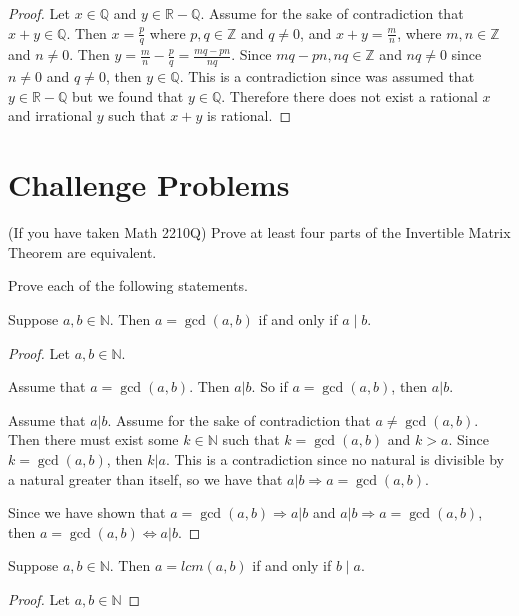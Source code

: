 \documentclass[12 pt]{exam}
\begin{document}
\begin{questions}
\begin{parts}
\begin{solution}\begin{proof}
  Let $x \in \mathbb{Q}$ and $y \in \mathbb{R-Q}$. Assume for the sake of contradiction that $x+y \in \mathbb{Q}$.
  Then $x = \frac{p}{q}$ where $p,q \in \mathbb{Z}$ and $q \ne 0$, and $x+y = \frac{m}{n}$, where $m,n
  \in \mathbb{Z}$ and $n \ne 0$. Then $y = \frac{m}{n} - \frac{p}{q} = \frac{mq - pn}{nq}$. Since $mq-pn, nq \in \mathbb{Z}$ and $nq \ne 0$ since $n \ne 0$ and $q \ne 0$, then $y \in \mathbb{Q}$. This is a contradiction
  since was assumed that $y \in \mathbb{R-Q}$ but we found that $y \in \mathbb{Q}$. Therefore there does not
  exist a rational $x$ and irrational $y$ such that $x+y$ is rational.
\end{proof}\end{solution}
\end{parts}





\section*{Challenge Problems}
\question (If you have taken Math 2210Q) Prove at least four parts of the Invertible Matrix Theorem are equivalent.

Prove each of the following statements.

\question Suppose $a, b \in \mathbb{N}$. Then $a=\gcd(a,b)$ if and only if $a \mid b.$
\begin{solution}\begin{proof}
  Let $a, b \in \mathbb{N}$.

  Assume that $a = \gcd(a,b)$. Then $a | b$. So if $a = \gcd(a,b)$, then $a | b$.

  Assume that $a | b$. Assume for the sake of contradiction that $a \ne \gcd(a, b)$. Then there must exist some
  $k \in \mathbb{N}$ such that $k = \gcd(a, b)$ and $k > a$. Since $k = \gcd(a, b)$, then $k | a$.
  This is a contradiction since no natural is divisible by a
  natural greater than itself, so we have that $a | b \Rightarrow a = \gcd(a,b)$.

  Since we have shown that $a = \gcd(a, b) \Rightarrow a | b$ and $a | b \Rightarrow a = \gcd(a,b)$,
  then $a = \gcd(a,b) \iff a | b$.
\end{proof}\end{solution}

\question Suppose $a, b \in \mathbb{N}$. Then $a=lcm(a,b)$ if and only if $b \mid a.$
\begin{solution}\begin{proof}
  Let $a, b \in \mathbb{N}$


\end{proof}
\end{solution}
\end{questions}
\end{document}

